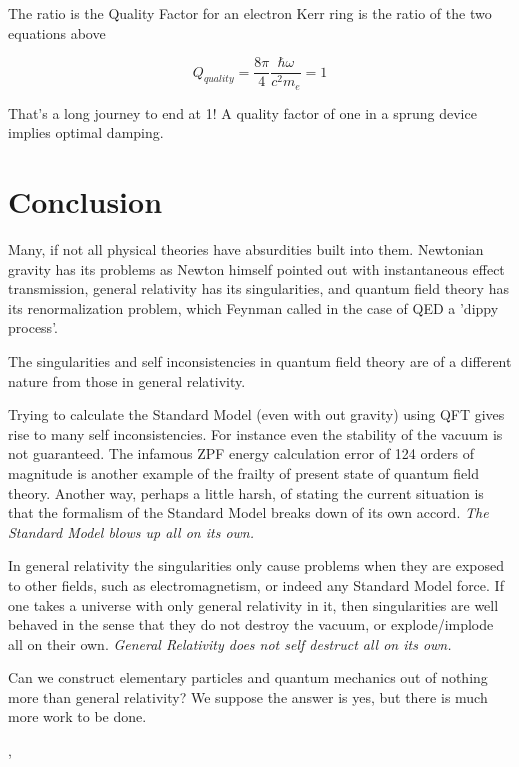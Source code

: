 \documentclass[../rzero]{subfiles}
\begin{document}
The ratio is the Quality Factor for an electron Kerr ring is the ratio of the two equations above

\begin{equation}
	Q_{quality} = \frac{8 \pi}{4} \frac{\hbar \omega}{c^2 m_e} = 1
\end{equation}

That's a long journey to end at 1! A quality factor of one in a sprung device implies optimal damping.

\section{Conclusion}


Many, if not all physical theories have absurdities built into them. Newtonian gravity has its problems as Newton himself pointed out with instantaneous effect transmission, general relativity has its singularities, and quantum field theory has its renormalization problem, which Feynman called in the case of QED a 'dippy process'\cite{Feynman1985}.
   
The singularities and self inconsistencies in quantum field theory are of a different nature from those in general relativity.
 
Trying to calculate the Standard Model (even with out gravity) using QFT gives rise to many self inconsistencies. For instance even the stability of the vacuum is not guaranteed\cite{Degrassi2013}. The infamous ZPF energy calculation error of 124 orders of magnitude is another example of the frailty of present state of quantum field theory. Another way, perhaps a little harsh, of stating the current situation is that the formalism of the Standard Model breaks down of its own accord. \textit{The Standard Model blows up all on its own.}

In general relativity the singularities only cause problems when they are exposed to other fields, such as electromagnetism, or indeed any Standard Model force. If one takes a universe with only general relativity in it, then singularities are well behaved in the sense that they do not destroy the vacuum, or explode/implode all on their own. \textit{General Relativity does not self destruct all on its own.}

Can we construct elementary particles and quantum mechanics out of nothing more than general relativity? We suppose the answer is yes, but there is much more work to be done. 






 





\cite{hestenesZitterbewegungStructureElectrons2020}, \cite{Burinskii2008}
\end{document}
